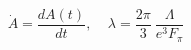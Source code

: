 \begin{equation}
\dot{A}=\frac{dA(t)}{dt},~~~~~\lambda=\frac{2\pi}{3}~\frac{\Lambda}{e^3 F_\pi}
\end{equation}

